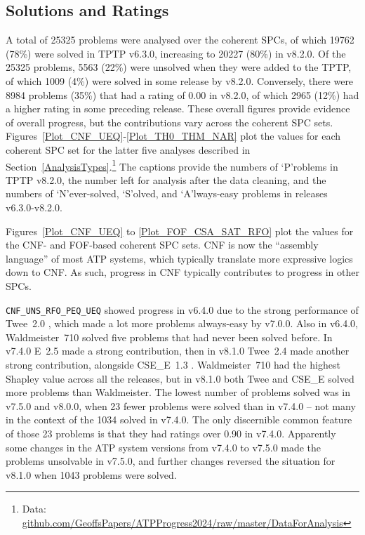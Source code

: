 \documentclass[runningheads]{llncs}
\begin{document}
\subsection{Solutions and Ratings}
\label{SolutionsAndRatings}

A total of 25325 problems were analysed over the coherent SPCs, of which 19762 (78\%) were 
solved in TPTP v6.3.0, increasing to 20227 (80\%) in v8.2.0.
Of the 25325 problems, 5563 (22\%) were unsolved when they were added to the TPTP, of which 1009 
(4\%) were solved in some release by v8.2.0. 
Conversely, there were 8984 problems (35\%) that had a rating of 0.00 in v8.2.0, of which 2965 
(12\%) had a higher rating in some preceding release.
These overall figures provide evidence of overall progress, but the contributions vary across
the coherent SPC sets.
Figures~\ref{Plot_CNF_UEQ}-\ref{Plot_TH0_THM_NAR} plot the values for each coherent SPC set
for the latter five analyses described in Section~\ref{AnalysisTypes}.\footnote{%
Data: \href{https://github.com/GeoffsPapers/ATPProgress2024/raw/master/DataForAnalysis}{github.com/GeoffsPapers/ATPProgress2024/raw/master/DataForAnalysis}}
The captions provide the numbers of `P'roblems in TPTP v8.2.0, the number left for analysis 
after the data cleaning, and the numbers of `N'ever-solved, `S'olved, and `A'lways-easy problems 
in releases v6.3.0-v8.2.0.

Figures~\ref{Plot_CNF_UEQ} to \ref{Plot_FOF_CSA_SAT_RFO} plot the values for the CNF- and
FOF-based coherent SPC sets.
CNF is now the ``assembly language'' of most ATP systems, which typically translate more
expressive logics down to CNF.
As such, progress in CNF typically contributes to progress in other SPCs.

{\tt CNF\_UNS\_RFO\_PEQ\_UEQ} showed progress in v6.4.0 due to the strong performance of
Twee~2.0 \cite{Sma21}, which made a lot more problems always-easy by v7.0.0.
Also in v6.4.0, Waldmeister~710 \cite{LH02} solved five problems that had never been solved 
before.
In v7.4.0 E~2.5 made a strong contribution, then in v8.1.0 Twee~2.4 made another strong 
contribution, alongside CSE\_E~1.3 \cite{XL+18}.
Waldmeister~710 had the highest Shapley value across all the releases, but in
v8.1.0 both Twee and CSE\_E solved more problems than Waldmeister.
The lowest number of problems solved was in v7.5.0 and v8.0.0, when 23 fewer problems were solved
than in v7.4.0 -- not many in the context of the 1034 solved in v7.4.0.
The only discernible common feature of those 23 problems is that they had ratings over 0.90 in 
v7.4.0.
Apparently some changes in the ATP system versions from v7.4.0 to v7.5.0 made the problems
unsolvable in v7.5.0, and further changes reversed the situation for v8.1.0 when 1043 problems
were solved.
 
\end{document}
